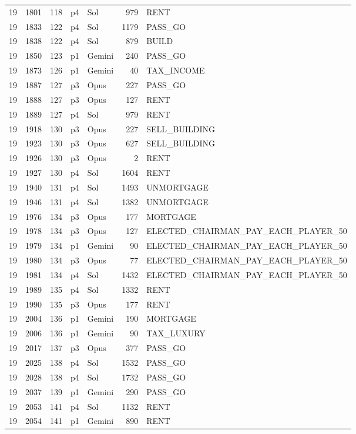 \begin{longtable}{r r r l l r L{2.2in}}
19 & 1801 & 118 & p4 & Sol & 979 & RENT \\
19 & 1833 & 122 & p4 & Sol & 1179 & PASS\_GO \\
19 & 1838 & 122 & p4 & Sol & 879 & BUILD \\
19 & 1850 & 123 & p1 & Gemini & 240 & PASS\_GO \\
19 & 1873 & 126 & p1 & Gemini & 40 & TAX\_INCOME \\
19 & 1887 & 127 & p3 & Opus & 227 & PASS\_GO \\
19 & 1888 & 127 & p3 & Opus & 127 & RENT \\
19 & 1889 & 127 & p4 & Sol & 979 & RENT \\
19 & 1918 & 130 & p3 & Opus & 227 & SELL\_BUILDING \\
19 & 1923 & 130 & p3 & Opus & 627 & SELL\_BUILDING \\
19 & 1926 & 130 & p3 & Opus & 2 & RENT \\
19 & 1927 & 130 & p4 & Sol & 1604 & RENT \\
19 & 1940 & 131 & p4 & Sol & 1493 & UNMORTGAGE \\
19 & 1946 & 131 & p4 & Sol & 1382 & UNMORTGAGE \\
19 & 1976 & 134 & p3 & Opus & 177 & MORTGAGE \\
19 & 1978 & 134 & p3 & Opus & 127 & ELECTED\_CHAIRMAN\_PAY\_EACH\_PLAYER\_50 \\
19 & 1979 & 134 & p1 & Gemini & 90 & ELECTED\_CHAIRMAN\_PAY\_EACH\_PLAYER\_50 \\
19 & 1980 & 134 & p3 & Opus & 77 & ELECTED\_CHAIRMAN\_PAY\_EACH\_PLAYER\_50 \\
19 & 1981 & 134 & p4 & Sol & 1432 & ELECTED\_CHAIRMAN\_PAY\_EACH\_PLAYER\_50 \\
19 & 1989 & 135 & p4 & Sol & 1332 & RENT \\
19 & 1990 & 135 & p3 & Opus & 177 & RENT \\
19 & 2004 & 136 & p1 & Gemini & 190 & MORTGAGE \\
19 & 2006 & 136 & p1 & Gemini & 90 & TAX\_LUXURY \\
19 & 2017 & 137 & p3 & Opus & 377 & PASS\_GO \\
19 & 2025 & 138 & p4 & Sol & 1532 & PASS\_GO \\
19 & 2028 & 138 & p4 & Sol & 1732 & PASS\_GO \\
19 & 2037 & 139 & p1 & Gemini & 290 & PASS\_GO \\
19 & 2053 & 141 & p4 & Sol & 1132 & RENT \\
19 & 2054 & 141 & p1 & Gemini & 890 & RENT \\

\end{longtable}
